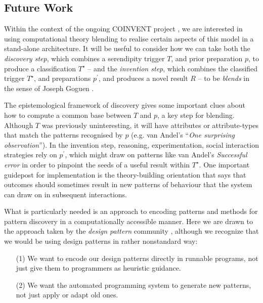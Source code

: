 \subsection{Future Work} \label{sec:futurework} \label{sec:hatching}

Within the context of the ongoing COINVENT project \cite{coinvent14},
we are interested in using computational theory blending to realise
certain aspects of this model in a stand-alone architecture.
%
It will be useful to consider how we can take both the \emph{discovery
  step}, which combines a serendipity trigger $T$, and prior
preparation $p$, to produce a classification $T^{\star}$ -- and the
\emph{invention step}, which combines the classified trigger
$T^{\star}$, and preparations $p^{\prime}$, and produces a novel
result $R$ -- to be \emph{blends} in the sense of Joseph Goguen
\citeyear{goguen1999introduction}.  

The epistemological framework of discovery gives some important clues
about how to compute a common base between $T$ and $p$, a key step for
blending.  Although $T$ was previously uninteresting, it will have
attributes or attribute-types that match the patterns recognised by
$p$ (e.g. van Andel's \citeyear{van1994anatomy} ``\emph{One surprising
  observation}'').
%
In the invention step, reasoning, experimentation, social interaction
strategies rely on $p^{\prime}$, which might draw on patterns like van
Andel's \emph{Successful error} in order to pinpoint the seeds of a useful result
within $T^{\star}$.  One important guidepost for implementation is
the theory-building orientation that says that outcomes should sometimes result in
new patterns of behaviour that the system can draw on in subsequent interactions.

What is particularly needed is an approach to encoding patterns and
methods for pattern discovery in a computationally accessible manner.
Here we are drawn to the approach taken by the \emph{design pattern}
community \cite{alexander1999origins}, although we recognize that we
would be using design patterns in rather nonstandard way:
\begin{itemize}
\item[(1)] We want to encode our design patterns directly in runnable
  programs, not just give them to programmers as heuristic guidance.
\item[(2)] We want the automated programming system to generate new
  patterns, not just apply or adapt old ones.
\end{itemize}

